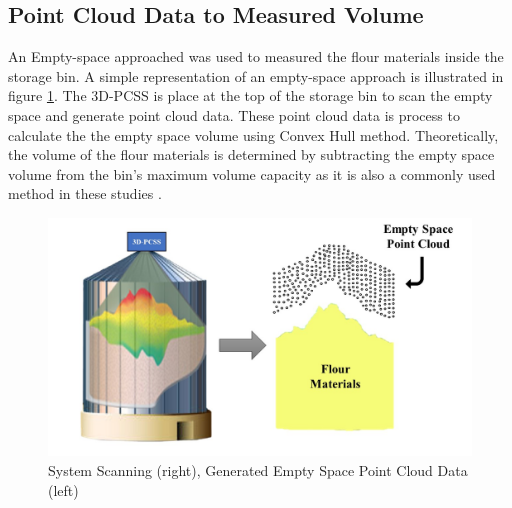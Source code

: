 \subsection{Point Cloud Data to Measured Volume}
\label{ch3:sec:Volume Estimation}
An Empty-space approached was used to measured the flour materials inside the storage bin. A simple representation of an empty-space approach is illustrated in figure \ref{ch3:fig:volume-estimation-figure}. The 3D-PCSS is place at the top of the storage bin to scan the empty space and generate point cloud data. These point cloud data is process to calculate the the empty space volume using Convex Hull method. Theoretically, the volume of the flour materials is determined by subtracting the empty space volume from the bin's maximum volume capacity as it is also a commonly used method in these studies \citet{raba2020,clar2022}.

\begin{figure}[H]
	\centering
	\includegraphics[width=1\textwidth]{Figures/empty_space}
	\caption{System Scanning (right), Generated Empty Space Point Cloud Data (left)}
	\label{ch3:fig:volume-estimation-figure}
\end{figure}




